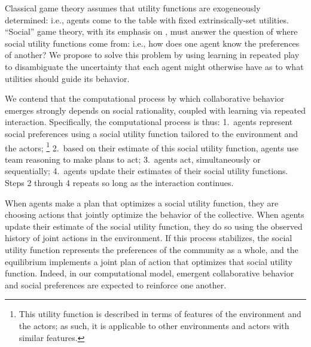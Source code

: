 

Classical game theory assumes that utility functions are exogeneously
determined: i.e., agents come to the table with fixed
extrinsically-set utilities.  ``Social'' game theory, with its
emphasis on , must answer the question of where social
utility functions come from: i.e., how does one agent know the
preferences of another?  We propose to solve this problem by using
learning in repeated play to disambiguate the uncertainty that each
agent might otherwise have as to what utilities should guide its
behavior.

We contend that the computational process by which collaborative
behavior emerges strongly depends on social rationality, coupled with
learning via repeated interaction.
%
Specifically, the computational process is thus:
1.~agents represent social preferences using a social utility function
tailored to the environment and the actors;%
\footnote{This utility function is described in terms of features of the environment and the actors;
as such, it is applicable to other environments and actors with similar features.}
2.~based on their estimate of this social utility function, agents use team reasoning to make plans to act;
3.~agents act, simultaneously or sequentially;
4.~agents update their estimates of their social utility functions.
Steps 2 through 4 repeats so long as the interaction continues.

When agents
make a plan that optimizes a social
utility function, they are choosing actions that jointly optimize the
behavior of the collective.
When agents update their estimate of the social utility function, they
do so using the observed history of joint actions in the environment.
If this process stabilizes, the social utility function represents the
preferences of the community as a whole, 
and the equilibrium implements a joint plan of action that optimizes
that social utility function.  Indeed, in our computational model,
emergent collaborative behavior and social preferences are expected to
reinforce one another.

